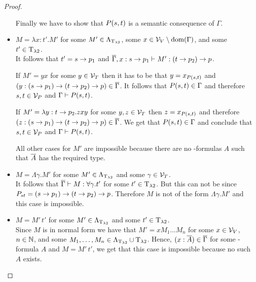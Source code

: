 \begin{proof}
\begin{itemize}
		Finally we have to show that $P(\predTFst,\predTSnd)$ is a semantic consequence of $\Gamma$.
		
		\begin{figure}[H]
			\centering
			
		\end{figure}
		
	\item[] \underline{$M=\lambda x:t'.M'$} for some $M'\in\Lambda_{\text{T}_{\lambda2}}$, some $x\in\mathcal{V}_V\setminus\text{dom}(\Gamma)$, and some $t'\in\text{T}_{\lambda2}$.\\
		It follows that $t'=\predTFst\to p_1$ and $\trans{\Gamma},x:\predTFst\to p_1\lambdaModels M':(\predTSnd\to p_2)\to p$.
		
		If $M'=yx$ for some $y\in\mathcal{V}_T$ then it has to be that $y=x_{P(\predTFst,\predTSnd)}$ and $(y:(\predTFst\to p_1)\to(\predTSnd\to p_2)\to p)\in\trans{\Gamma}$. It follows that $P(\predTFst,\predTSnd)\in\Gamma$ and therefore $\predTFst,\predTSnd\in\VarP$ and $\Gamma\PModels P(\predTFst,\predTSnd)$.
		
		If $M'=\lambda y:\predTSnd\to p_2.zxy$ for some $y,z\in\mathcal{V}_T$ then $z=x_{P(\predTFst,\predTSnd)}$ and therefore $(z:(\predTFst\to p_1)\to(\predTSnd\to p_2)\to p)\in\trans{\Gamma}$. We get that $P(\predTFst,\predTSnd)\in\Gamma$ and conclude that $\predTFst,\predTSnd\in\VarP$ and $\Gamma\PModels P(\predTFst,\predTSnd)$.
		
		All other cases for $M'$ are impossible because there are no \SysP-formulas $A$ such that $\overline{A}$ has the required type. 
	\item[] \underline{$M=\Lambda\gamma.M'$} for some $M'\in\Lambda_{\text{T}_{\lambda2}}$ and some $\gamma\in\mathcal{V}_T$.\\ %
		It follows that $\overline{\Gamma}\vdash M:\forall\gamma.t'$ for some $t'\in\text{T}_{\lambda2}$.
		But this can not be since $\code{P}{\predTFst}{\predTSnd}=(\predTFst\to p_1)\to(\predTSnd\to p_2)\to p$. Therefore $M$ is not of the form $\Lambda\gamma.M'$ and this case is impossible.

	\item[] \underline{$M=M'\,t'$} for some $M'\in\Lambda_{\text{T}_{\lambda2}}$ and some $t'\in\text{T}_{\lambda2}$.\\
		Since $M$ is in normal form we have that $M'=xM_1\dots M_n$ for some $x\in\mathcal{V}_V$, $n\in\mathbb{N}$, and some $M_1,\dots,M_n\in\Lambda_{\text{T}_{\lambda2}}\cup\text{T}_{\lambda2}$.
		Hence, $(x:\overline{A})\in\overline{\Gamma}$ for some \SysP-formula $A$ and $M=M'\,t'$, we get that this case is impossible because no such $A$ exists.
		

\end{itemize}
\end{proof}
